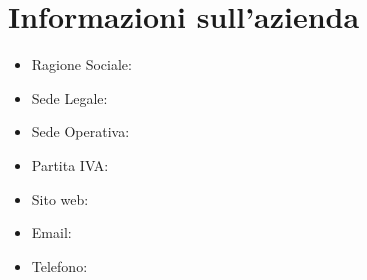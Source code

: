 \section{Informazioni sull'azienda}
\begin{itemize}
  \item Ragione Sociale:
  \item Sede Legale:
  \item Sede Operativa:
  \item Partita IVA: 
  \item Sito web:
  \item Email:
  \item Telefono:
\end{itemize}

